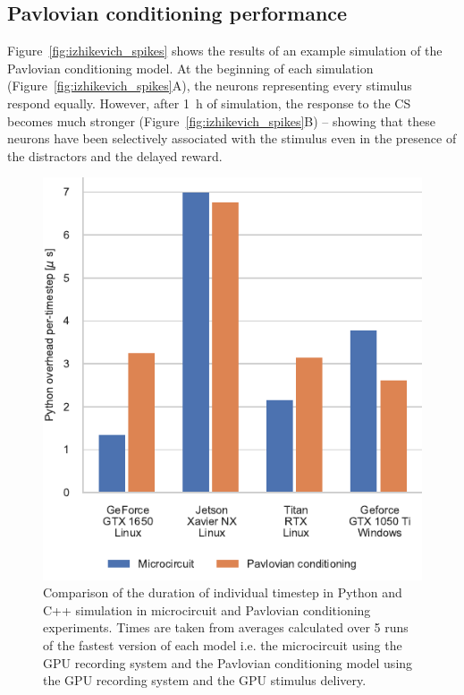 \documentclass[utf8]{frontiersSCNS} %
\begin{document}
\subsection{Pavlovian conditioning performance}
Figure~\ref{fig:izhikevich_spikes} shows the results of an example simulation of the Pavlovian conditioning model.
At the beginning of each simulation (Figure~\ref{fig:izhikevich_spikes}A), the neurons representing every stimulus respond equally.
However, after \SI{1}{\hour} of simulation, the response to the CS becomes much stronger (Figure~\ref{fig:izhikevich_spikes}B) -- showing that these neurons have been selectively associated with the stimulus even in the presence of the distractors and the delayed reward.
%
\begin{figure}[t!]
    \begin{center}
        \includegraphics{figures/compare_overhead.pdf}
    \end{center}
    \caption{Comparison of the duration of individual timestep in Python and C++ simulation in microcircuit and Pavlovian conditioning experiments.
    Times are taken from averages calculated over 5 runs of the fastest version of each model i.e. the microcircuit using the GPU recording system and the Pavlovian conditioning model using the GPU recording system and the GPU stimulus delivery.}
    \label{fig:compare_overhead}
\end{figure}
\end{document}

